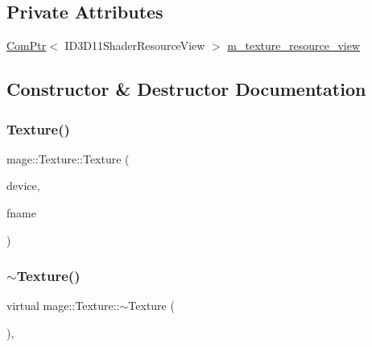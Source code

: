 \subsection*{Private Attributes}
\begin{DoxyCompactItemize}
\item 
\hyperlink{namespacemage_ae74f374780900893caa5555d1031fd79}{Com\+Ptr}$<$ I\+D3\+D11\+Shader\+Resource\+View $>$ \hyperlink{classmage_1_1_texture_a3de1d2d744e7bb276b0f66d72640e423}{m\+\_\+texture\+\_\+resource\+\_\+view}
\end{DoxyCompactItemize}


\subsection{Constructor \& Destructor Documentation}
\hypertarget{classmage_1_1_texture_a4af52927638604e184de30d8a13bc224}{}\label{classmage_1_1_texture_a4af52927638604e184de30d8a13bc224} 
\subsubsection{\texorpdfstring{Texture()}{Texture()}\hspace{0.1cm}{\footnotesize\ttfamily [1/2]}}
{\footnotesize\ttfamily mage\+::\+Texture\+::\+Texture (\begin{DoxyParamCaption}\item[{const \hyperlink{classmage_1_1_rendering_device}{Rendering\+Device} \&}]{device,  }\item[{const wstring \&}]{fname }\end{DoxyParamCaption})}

\hypertarget{classmage_1_1_texture_a81664804ac0259e8c67851409ee106fa}{}\label{classmage_1_1_texture_a81664804ac0259e8c67851409ee106fa} 
\subsubsection{\texorpdfstring{$\sim$\+Texture()}{~Texture()}}
{\footnotesize\ttfamily virtual mage\+::\+Texture\+::$\sim$\+Texture (\begin{DoxyParamCaption}{ }\end{DoxyParamCaption})\hspace{0.3cm}{\ttfamily [virtual]}, {\ttfamily [default]}}

